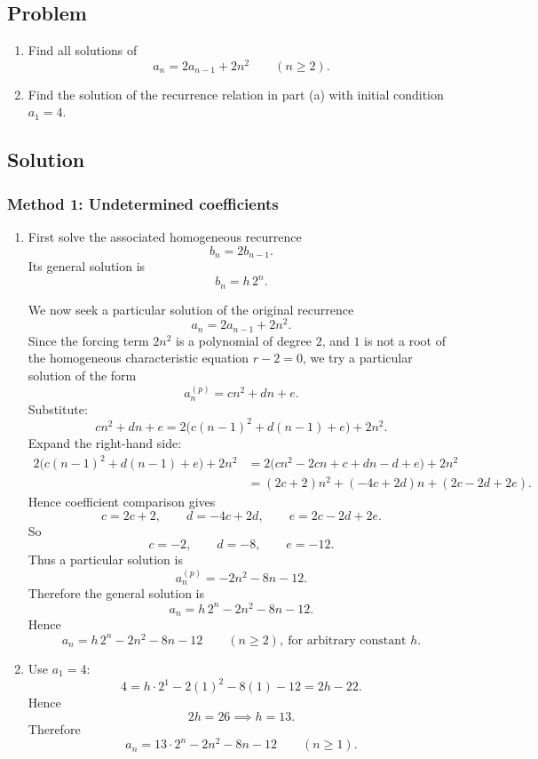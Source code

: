\documentclass[12pt]{article}
\begin{document}
\subsection{Problem}
\begin{enumerate}[label=(\alph*)]
\item Find all solutions of
\[
a_n=2a_{n-1}+2n^2 \qquad (n\ge 2).
\]
\item Find the solution of the recurrence relation in part (a) with initial condition \(a_1=4\).
\end{enumerate}

\subsection{Solution}

\subsubsection{Method 1: Undetermined coefficients}
\begin{enumerate}[label=(\alph*)]
\item First solve the associated homogeneous recurrence
\[
b_n=2b_{n-1}.
\]
Its general solution is
\[
b_n=h\,2^n.
\]

We now seek a particular solution of the original recurrence
\[
a_n=2a_{n-1}+2n^2.
\]
Since the forcing term \(2n^2\) is a polynomial of degree \(2\), and \(1\) is not a root of the homogeneous characteristic equation \(r-2=0\), we try a particular solution of the form
\[
a_n^{(p)}=cn^2+dn+e.
\]
Substitute:
\[
cn^2+dn+e=2\bigl(c(n-1)^2+d(n-1)+e\bigr)+2n^2.
\]
Expand the right-hand side:
\begin{align*}
2\bigl(c(n-1)^2+d(n-1)+e\bigr)+2n^2
&=2\bigl(cn^2-2cn+c+dn-d+e\bigr)+2n^2\\
&=(2c+2)n^2+(-4c+2d)n+(2c-2d+2e).
\end{align*}
Hence coefficient comparison gives
\[
c=2c+2,\qquad d=-4c+2d,\qquad e=2c-2d+2e.
\]
So
\[
c=-2,\qquad d=-8,\qquad e=-12.
\]
Thus a particular solution is
\[
a_n^{(p)}=-2n^2-8n-12.
\]
Therefore the general solution is
\[
a_n=h\,2^n-2n^2-8n-12.
\]
Hence
\[
\boxed{a_n=h\,2^n-2n^2-8n-12\qquad (n\ge 2),\ \text{for arbitrary constant }h.}
\]

\item Use \(a_1=4\):
\[
4=h\cdot 2^1-2(1)^2-8(1)-12=2h-22.
\]
Hence
\[
2h=26 \implies h=13.
\]
Therefore
\[
\boxed{a_n=13\cdot 2^n-2n^2-8n-12\qquad (n\ge 1).}
\]
\end{enumerate}
\end{document}
